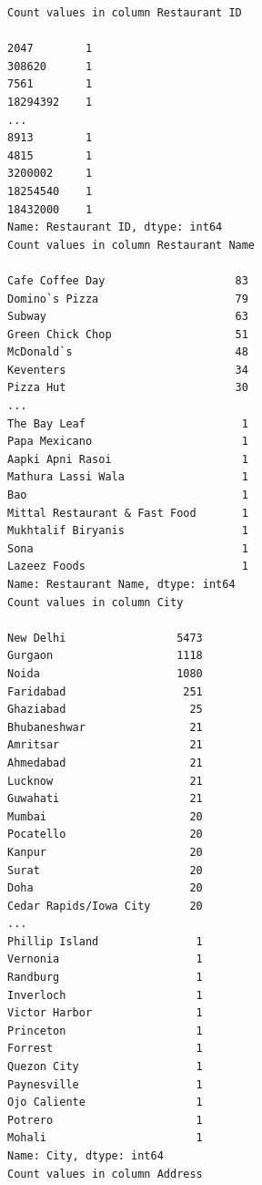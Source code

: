 \documentclass[11pt]{article} %
\begin{document}
\begin{lstlisting}
Count values in column Restaurant ID 

2047        1
308620      1
7561        1
18294392    1
...
8913        1
4815        1
3200002     1
18254540    1
18432000    1
Name: Restaurant ID, dtype: int64
Count values in column Restaurant Name 

Cafe Coffee Day                    83
Domino`s Pizza                     79
Subway                             63
Green Chick Chop                   51
McDonald`s                         48
Keventers                          34
Pizza Hut                          30
...
The Bay Leaf                        1
Papa Mexicano                       1
Aapki Apni Rasoi                    1
Mathura Lassi Wala                  1
Bao                                 1
Mittal Restaurant & Fast Food       1
Mukhtalif Biryanis                  1
Sona                                1
Lazeez Foods                        1
Name: Restaurant Name, dtype: int64
Count values in column City 

New Delhi                 5473
Gurgaon                   1118
Noida                     1080
Faridabad                  251
Ghaziabad                   25
Bhubaneshwar                21
Amritsar                    21
Ahmedabad                   21
Lucknow                     21
Guwahati                    21
Mumbai                      20
Pocatello                   20
Kanpur                      20
Surat                       20
Doha                        20
Cedar Rapids/Iowa City      20
...
Phillip Island               1
Vernonia                     1
Randburg                     1
Inverloch                    1
Victor Harbor                1
Princeton                    1
Forrest                      1
Quezon City                  1
Paynesville                  1
Ojo Caliente                 1
Potrero                      1
Mohali                       1
Name: City, dtype: int64
Count values in column Address 


\end{lstlisting}
\end{document}
